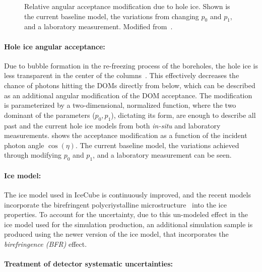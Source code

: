 \begin{figure}[h]
    \centering
    
    \caption[Hole ice angular acceptance modification]{Relative angular acceptance modification due to hole ice. Shown is the current baseline model, the variations from changing $p_0$ and $p_1$, and a laboratory measurement. Modified from~\cite{ATrettin_phd}.}
\end{figure}
\paragraph{Hole ice angular acceptance:}

Due to bubble formation in the re-freezing process of the boreholes, the hole ice is less transparent in the center of the columns~. This effectively decreases the chance of photons hitting the DOMs directly from below, which can be described as an additional angular modification of the DOM acceptance. The modification is parameterized by a two-dimensional, normalized function, where the two dominant of the parameters ($p_0, p_1$), dictating its form, are enough to describe all past and the current hole ice models from both \textit{in-situ} and laboratory measurements.  shows the acceptance modification as a function of the incident photon angle $\cos(\eta)$. The current baseline model, the variations achieved through modifying $p_0$ and $p_1$, and a laboratory measurement can be seen.


\paragraph{Ice model:}

The ice model used in IceCube is continuously improved, and the recent models incorporate the birefringent polycriystalline microstructure~ into the ice properties. To account for the uncertainty, due to this un-modeled effect in the ice model used for the simulation production, an additional simulation sample is produced using the newer version of the ice model, that incorporates the \textit{birefringence (BFR)} effect. 


\paragraph{Treatment of detector systematic uncertainties:} 

